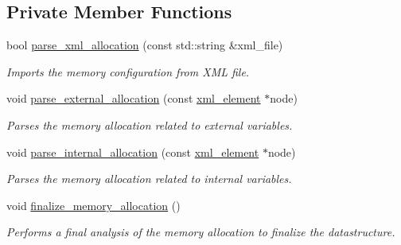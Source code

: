 \subsection*{Private Member Functions}
\begin{DoxyCompactItemize}
\item 
bool \hyperlink{classmem__xml__allocation_a693defa1d1e5801b490788f19f4aeddc}{parse\+\_\+xml\+\_\+allocation} (const std\+::string \&xml\+\_\+file)
\begin{DoxyCompactList}\small\item\em Imports the memory configuration from X\+ML file. \end{DoxyCompactList}\item 
void \hyperlink{classmem__xml__allocation_a07bd3a79034972bb53511ab5d17f00e6}{parse\+\_\+external\+\_\+allocation} (const \hyperlink{classxml__element}{xml\+\_\+element} $\ast$node)
\begin{DoxyCompactList}\small\item\em Parses the memory allocation related to external variables. \end{DoxyCompactList}\item 
void \hyperlink{classmem__xml__allocation_ac852d2afeb6ecf0daf13d20befcb9071}{parse\+\_\+internal\+\_\+allocation} (const \hyperlink{classxml__element}{xml\+\_\+element} $\ast$node)
\begin{DoxyCompactList}\small\item\em Parses the memory allocation related to internal variables. \end{DoxyCompactList}\item 
void \hyperlink{classmem__xml__allocation_a138ace3d0d2e08742168d52adb53191f}{finalize\+\_\+memory\+\_\+allocation} ()
\begin{DoxyCompactList}\small\item\em Performs a final analysis of the memory allocation to finalize the datastructure. \end{DoxyCompactList}\end{DoxyCompactItemize}
